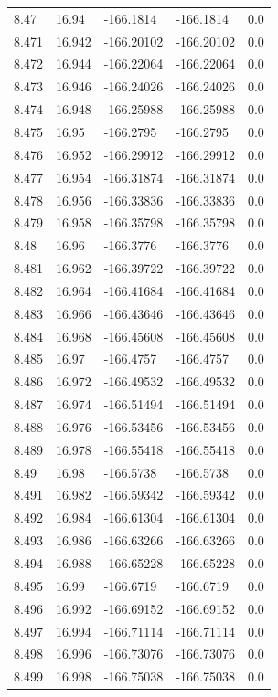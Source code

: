 \begin{tabular}{lllll}
8.47 & 16.94 & -166.1814 & -166.1814 & 0.0 \\
8.471 & 16.942 & -166.20102 & -166.20102 & 0.0 \\
8.472 & 16.944 & -166.22064 & -166.22064 & 0.0 \\
8.473 & 16.946 & -166.24026 & -166.24026 & 0.0 \\
8.474 & 16.948 & -166.25988 & -166.25988 & 0.0 \\
8.475 & 16.95 & -166.2795 & -166.2795 & 0.0 \\
8.476 & 16.952 & -166.29912 & -166.29912 & 0.0 \\
8.477 & 16.954 & -166.31874 & -166.31874 & 0.0 \\
8.478 & 16.956 & -166.33836 & -166.33836 & 0.0 \\
8.479 & 16.958 & -166.35798 & -166.35798 & 0.0 \\
8.48 & 16.96 & -166.3776 & -166.3776 & 0.0 \\
8.481 & 16.962 & -166.39722 & -166.39722 & 0.0 \\
8.482 & 16.964 & -166.41684 & -166.41684 & 0.0 \\
8.483 & 16.966 & -166.43646 & -166.43646 & 0.0 \\
8.484 & 16.968 & -166.45608 & -166.45608 & 0.0 \\
8.485 & 16.97 & -166.4757 & -166.4757 & 0.0 \\
8.486 & 16.972 & -166.49532 & -166.49532 & 0.0 \\
8.487 & 16.974 & -166.51494 & -166.51494 & 0.0 \\
8.488 & 16.976 & -166.53456 & -166.53456 & 0.0 \\
8.489 & 16.978 & -166.55418 & -166.55418 & 0.0 \\
8.49 & 16.98 & -166.5738 & -166.5738 & 0.0 \\
8.491 & 16.982 & -166.59342 & -166.59342 & 0.0 \\
8.492 & 16.984 & -166.61304 & -166.61304 & 0.0 \\
8.493 & 16.986 & -166.63266 & -166.63266 & 0.0 \\
8.494 & 16.988 & -166.65228 & -166.65228 & 0.0 \\
8.495 & 16.99 & -166.6719 & -166.6719 & 0.0 \\
8.496 & 16.992 & -166.69152 & -166.69152 & 0.0 \\
8.497 & 16.994 & -166.71114 & -166.71114 & 0.0 \\
8.498 & 16.996 & -166.73076 & -166.73076 & 0.0 \\
8.499 & 16.998 & -166.75038 & -166.75038 & 0.0 \\

\end{tabular}

